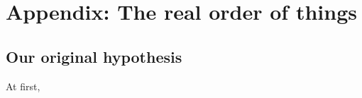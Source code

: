 \chapter*{Appendix: The real order of things}
\label{app:real}

\section*{Our original hypothesis}
    At first,   
